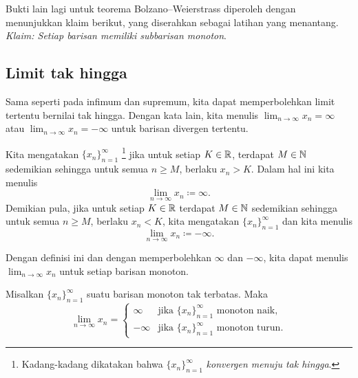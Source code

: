 Bukti lain lagi untuk teorema Bolzano--Weierstrass diperoleh dengan menunjukkan
klaim berikut,
yang diserahkan sebagai latihan yang menantang.
\emph{Klaim: Setiap barisan memiliki subbarisan monoton}.

\subsection{Limit tak hingga}

Sama seperti pada infimum dan supremum, kita dapat memperbolehkan limit tertentu
bernilai tak hingga.  Dengan kata lain, kita menulis $\lim_{n\to\infty} x_n = \infty$ atau
$\lim_{n\to\infty} x_n = -\infty$ untuk barisan divergen tertentu.

\begin{defn}
Kita mengatakan
$\{ x_n \}_{n=1}^\infty$ \emph{}%
\footnote{Kadang-kadang dikatakan bahwa $\{ x_n \}_{n=1}^\infty$ \emph{konvergen menuju tak hingga}.}
jika untuk setiap $K \in
{\mathbb{R}}$, terdapat $M \in {\mathbb{N}}$ sedemikian sehingga untuk semua $n \geq M$, berlaku $x_n >
K$.  Dalam hal ini kita menulis
\begin{equation*}
\lim_{n \to \infty} x_n \coloneqq \infty .  
\end{equation*}
Demikian pula,
jika untuk setiap $K \in {\mathbb{R}}$ terdapat $M \in {\mathbb{N}}$ sedemikian sehingga
untuk semua $n \geq M$, berlaku $x_n < K$, kita mengatakan $\{ x_n \}_{n=1}^\infty$
\emph{} dan kita menulis
\begin{equation*}
\lim_{n \to \infty} x_n \coloneqq -\infty .  
\end{equation*}
\end{defn}

Dengan definisi ini dan dengan memperbolehkan $\infty$ dan $-\infty$,
kita dapat menulis $\lim_{n\to\infty} x_n$ untuk setiap barisan monoton.

\begin{prop} \label{prop:unboundedmonotone}
Misalkan $\{ x_n \}_{n=1}^\infty$ suatu barisan monoton tak terbatas.  Maka
\begin{equation*}
\lim_{n \to \infty} x_n =
\begin{cases}
\infty  & \text{jika } \{ x_n \}_{n=1}^\infty \text{ monoton naik,} \\
-\infty & \text{jika } \{ x_n \}_{n=1}^\infty \text{ monoton turun.}
\end{cases}
\end{equation*}
\end{prop}

